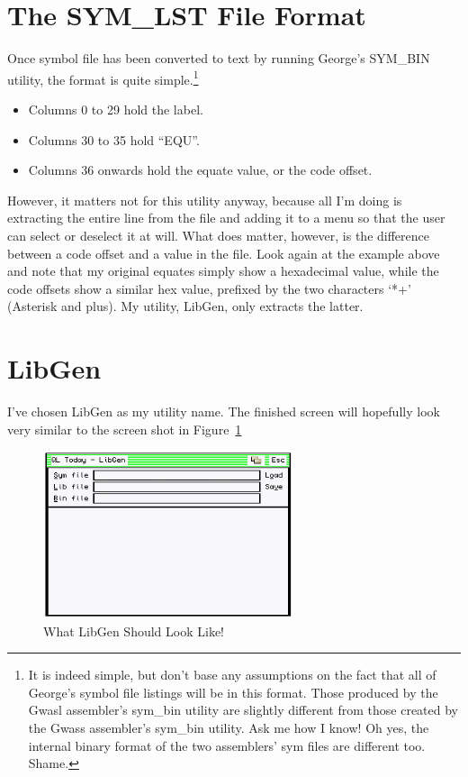 \section{The SYM\_LST File Format}
\label{ch31-sym-lst-format}%

Once symbol file has been converted to text by running George's
 SYM\_BIN utility, the format is quite
    simple.\footnote{It is indeed simple, but don't base any assumptions on the fact that all of George's symbol file listings will be in this format. Those produced by the Gwasl assembler's sym\_bin utility are slightly different from those created by the Gwass assembler's sym\_bin utility. Ask me how I know! Oh yes, the internal binary format of the two assemblers' sym files are different too. Shame.}
\begin{itemize}[itemsep=0pt]

\item{}Columns 0 to 29 hold the label.

\item{}Columns 30 to 35 hold ``EQU''.

\item{}Columns 36 onwards hold the equate value, or the code
        offset.

\end{itemize}

However, it matters not for this utility anyway, because all I'm
    doing is extracting the entire line from the file and adding it to a menu
    so that the user can select or deselect it at will. What does matter,
    however, is the difference between a code offset and a value in the file.
    Look again at the example above and note that my original equates simply
    show a hexadecimal value, while the code offsets show a similar hex value,
    prefixed by the two characters `*+' (Asterisk and plus). My utility,
 LibGen, only extracts the latter.

\section{LibGen}
\label{ch31-Lib-Gen}%

I've chosen LibGen as my utility name.
    The finished screen will hopefully look very similar to the screen shot in Figure~\ref{fig:WhatLibGenShouldLookLike}

\begin{figure}[h]
\center
\includegraphics[width=0.65\textwidth]{Content/images/libgen_1.png}
\caption{What LibGen Should Look Like!}
\label{fig:WhatLibGenShouldLookLike}
\end{figure}


